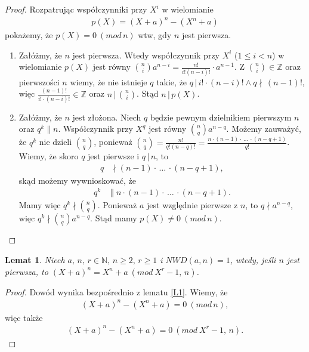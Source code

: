 \documentclass[polish,declaration,shortabstract]{iithesis}
\theoremstyle{definition}
\theoremstyle{remark} \newtheorem{observation}{Obserwacja}
\theoremstyle{plain} \newtheorem{theorem}{Twierdzenie}
\theoremstyle{plain} \newtheorem{lemma}{Lemat}
\theoremstyle{remark} \newtheorem*{remark*}{Uwaga}
\theoremstyle{reminder} \newtheorem*{reminder*}{Przypomnienie}
\begin{document}
\begin{proof}
	Rozpatrując współczynniki przy $X^i$ w wielomianie 
	\begin{align*}
		p(X) = (X + a)^n - (X^n + a) 
	\end{align*}
	pokażemy, że $p(X) = 0 \: (mod \, n)$ wtw, gdy $n$ jest pierwsza. 
	\begin{enumerate}[label=(\arabic*),leftmargin=.4in]
		\item Załóżmy, że $n$ jest pierwsza. Wtedy współczynnik przy $X^i$ ($1 \leq i < n$) w wielomianie $p(X)$ jest równy ${n \choose i}a^{n-i} = \frac{n!}{i!(n-i)!} \cdot a^{n-1}$. Z ${n \choose i} \in \mathbb{Z}$ oraz pierwszości $n$ wiemy, że nie istnieje $q$ takie, że $q \, | \, i! \cdot (n-i)! \wedge q \nmid \, (n - 1)!$, więc $\frac{(n - 1)!}{i! \cdot (n - i)!} \in \mathbb{Z}$ oraz $n \, | \, {n \choose i}$. Stąd $n \, | \, p(X)$.
		\item Załóżmy, że $n$ jest złożona. Niech $q$ będzie pewnym dzielnikiem pierwszym $n$ oraz $q^k \parallel n$. Współczynnik przy $X^q$ jest równy ${n \choose q}a^{n-q}$. Możemy zauważyć, że $q^k$ nie dzieli ${n \choose q}$, ponieważ ${n \choose q} = \frac{n!}{q!(n-q)!} = \frac{n \cdot (n-1) \cdot \, \dots \, \cdot (n - q + 1)}{q!}$. Wiemy, że skoro $q$ jest pierwsze i $q \,| \, n$, to 
		      \begin{align*}
		      	q & \nmid (n-1) \cdot \, \dots \, \cdot (n - q + 1), 
		      \end{align*}
		      skąd możemy wywnioskować, że
		      \begin{align*}
		      	q^k & \parallel n \cdot (n-1) \cdot \, \dots \, \cdot (n - q + 1). 
		      \end{align*}
		      Mamy więc $q^k \nmid {n \choose q}$. Ponieważ $a$ jest względnie pierwsze z $n$, to $q \nmid a^{n-q}$, więc $q^k \nmid {n \choose q}a^{n-q}$. Stąd mamy $p(X) \neq 0 \: (mod \, n)$.
	\end{enumerate}
\end{proof}

\begin{lemma} \label{L2}
	Niech $a,\, n, \, r \in \mathbb{N},\, n \geq 2,\, r \geq 1$ i $NWD(a, n) = 1$, wtedy, jeśli $n$ jest pierwsza, to $(X + a)^n = X^n + a \: (mod \: X^r - 1,\, n)$.
\end{lemma}
	
\begin{proof}
	Dowód wynika bezpośrednio z lematu \ref{L1}. Wiemy, że 
	\begin{align*}
		(X + a)^n - (X^n + a) = 0 \: (mod \, n), 
	\end{align*}
	więc także 
	\begin{align*}
		(X + a)^n - (X^n + a) = 0 \: (mod \: X^r - 1,\, n). 
	\end{align*}
\end{proof}
\end{document}
